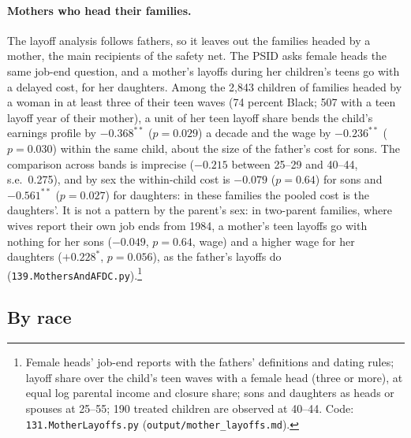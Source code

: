 \paragraph{Mothers who head their families.} The layoff analysis follows fathers, so it leaves out the families headed
by a mother, the main recipients of the safety net. The PSID asks female heads the same job-end question, and a
mother's layoffs during her children's teens go with a delayed cost, for her daughters. Among the 2,843 children of families
headed by a woman in at least three of their teen waves (74 percent Black; 507 with a teen layoff year of their
mother), a unit of her teen layoff share bends the child's earnings profile by $-0.368^{**}$ ($p = 0.029$) a decade and
the wage by $-0.236^{**}$ ($p = 0.030$) within the same child, about the size of the father's cost for sons. The comparison
across bands is imprecise ($-0.215$ between 25--29 and 40--44, s.e.\ 0.275), and by sex the within-child cost is
$-0.079$ ($p = 0.64$) for sons and $-0.561^{**}$ ($p = 0.027$) for daughters: in these families the pooled cost is the
daughters'. It is not a pattern by the parent's sex: in two-parent families, where wives report their own job ends
from 1984, a mother's teen layoffs go with nothing for her sons ($-0.049$, $p = 0.64$, wage) and a higher wage for her
daughters ($+0.228^{*}$, $p = 0.056$), as the father's layoffs do (\texttt{139.MothersAndAFDC.py}).\footnote{Female heads' job-end reports with
the fathers' definitions and dating rules; layoff share over the child's teen waves with a female head (three or
more), at equal log parental income and closure share; sons and daughters as heads or spouses at 25--55; 190 treated
children are observed at 40--44. Code: \texttt{131.MotherLayoffs.py} (\texttt{output/mother\_layoffs.md}).}



\subsection{By race}

